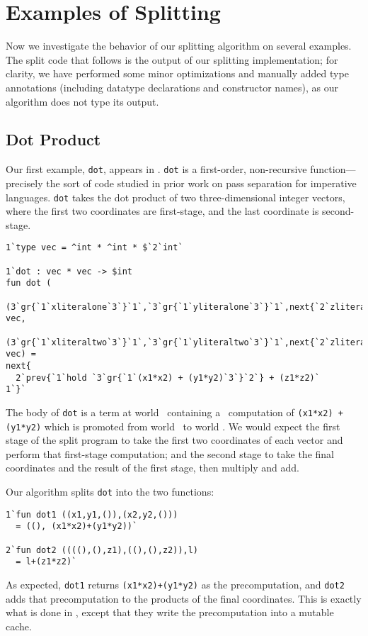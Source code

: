  \section{Examples of Splitting}
\label{sec:examples}

Now we investigate the behavior of our splitting algorithm on several examples.
The split code that follows is the output of our splitting implementation; for
clarity, we have performed some minor optimizations and manually added type
annotations (including datatype declarations and constructor names), as our
algorithm does not type its output.

\subsection{Dot Product}

Our first example, \texttt{dot}, appears in \cite{knoblock96}. \texttt{dot} is a
first-order, non-recursive function---precisely the sort of code studied in
prior work on pass separation for imperative languages. \texttt{dot} takes the
dot product of two three-dimensional integer vectors, where the first two
coordinates are first-stage, and the last coordinate is second-stage. 
%
\begin{lstlisting} 
1`type vec = ^int * ^int * $`2`int`

1`dot : vec * vec -> $int
fun dot (
  (3`gr{`1`xliteralone`3`}`1`,`3`gr{`1`yliteralone`3`}`1`,next{`2`zliteralone`1`}): vec,
  (3`gr{`1`xliteraltwo`3`}`1`,`3`gr{`1`yliteraltwo`3`}`1`,next{`2`zliteraltwo`1`}): vec) = 
next{
  2`prev{`1`hold `3`gr{`1`(x1*x2) + (y1*y2)`3`}`2`} + (z1*z2)`
1`}`
\end{lstlisting}
%
The body of \texttt{dot} is a \rmint{} term at world \bbtwo\ containing a
\rmint\ computation of \texttt{(x1*x2) + (y1*y2)} which is promoted from world
\bbonep\ to world \bbtwo. We would expect the first stage of the split program
to take the first two coordinates of each vector and perform that first-stage
computation; and the second stage to take the final coordinates and the result
of the first stage, then multiply and add.

Our algorithm splits \texttt{dot} into the two functions:
%
\begin{lstlisting} 
1`fun dot1 ((x1,y1,()),(x2,y2,())) 
  = ((), (x1*x2)+(y1*y2))`

2`fun dot2 ((((),(),z1),((),(),z2)),l) 
  = l+(z1*z2)`
\end{lstlisting}
%
As expected, \texttt{dot1} returns \texttt{(x1*x2)+(y1*y2)} as the
precomputation, and \texttt{dot2} adds that precomputation to the products of
the final coordinates. This is exactly what is done in \cite{knoblock96}, except
that they write the precomputation into a mutable cache.

